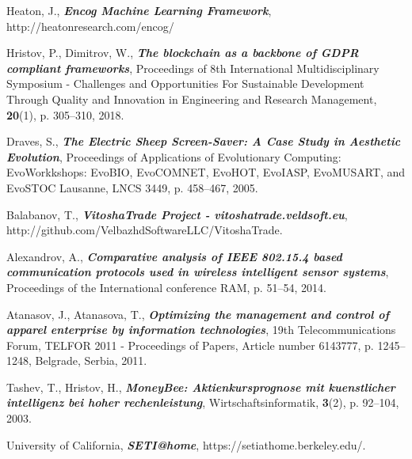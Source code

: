 \documentclass[runningheads]{llncs}
\begin{document}
\begin{thebibliography}{8}
 Heaton, J., \textbf{\textit{Encog Machine Learning Framework}}, http://heatonresearch.com/encog/

 Hristov, P., Dimitrov, W., \textbf{\textit{The blockchain as a backbone of GDPR compliant frameworks}}, Proceedings of 8th International Multidisciplinary Symposium - Challenges and Opportunities For Sustainable Development Through Quality and Innovation in Engineering and Research Management, \textbf{20}(1), p. 305--310, 2018.

 Draves, S., \textbf{\textit{The Electric Sheep Screen-Saver: A Case Study in Aesthetic Evolution}}, Proceedings of Applications of Evolutionary Computing: EvoWorkkshops: EvoBIO, EvoCOMNET, EvoHOT, EvoIASP, EvoMUSART, and EvoSTOC Lausanne, LNCS 3449, p. 458--467, 2005.

 Balabanov, T., \textbf{\textit{VitoshaTrade Project - vitoshatrade.veldsoft.eu}}, http://github.com/VelbazhdSoftwareLLC/VitoshaTrade.

 Alexandrov, A., \textbf{\textit{Comparative analysis of IEEE 802.15.4 based communication protocols used in wireless intelligent sensor systems}}, Proceedings of the International conference RAM, p. 51--54, 2014.

 Atanasov, J., Atanasova, T., \textbf{\textit{Optimizing the management and control of apparel enterprise by information technologies}}, 19th Telecommunications Forum, TELFOR 2011 - Proceedings of Papers, Article number 6143777, p. 1245--1248, Belgrade, Serbia, 2011.

 Tashev, T., Hristov, H., \textbf{\textit{MoneyBee: Aktienkursprognose mit kuenstlicher intelligenz bei hoher rechenleistung}}, Wirtschaftsinformatik, \textbf{3}(2), p. 92--104, 2003.

University of California, \textbf{\textit{SETI@home}}, https://setiathome.berkeley.edu/.

\end{thebibliography}
\end{document}
